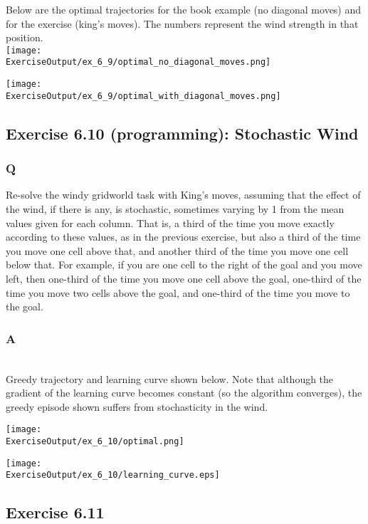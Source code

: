 Below are the optimal trajectories for the book example (no diagonal moves) and for the exercise (king's moves). The numbers represent the wind strength in that position.\\

\texttt{[image: \\ExerciseOutput/ex\_6\_9/optimal\_no\_diagonal\_moves.png]}

\texttt{[image: \\ExerciseOutput/ex\_6\_9/optimal\_with\_diagonal\_moves.png]}



\subsection{Exercise 6.10 (programming): Stochastic Wind}
\subsubsection*{Q}
Re-solve the windy gridworld task with King’s moves, assuming that the effect of the wind, if there is any, is stochastic, sometimes varying by 1 from the mean values given for each column. That is, a third of the time you move exactly according to these values, as in the previous exercise, but also a third of the time you move one cell above that, and another third of the time you move one cell below that. For example, if you are one cell to the right of the goal and you move left, then one-third of the time you move one cell above the goal, one-third of the time you move two cells above the goal, and one-third of the time you move to the goal.

\subsubsection*{A}
\ProgrammingExercise\\

Greedy trajectory and learning curve shown below. Note that although the gradient of the learning curve becomes constant (so the algorithm converges), the greedy episode shown suffers from stochasticity in the wind.

\texttt{[image: \\ExerciseOutput/ex\_6\_10/optimal.png]}

\texttt{[image: \\ExerciseOutput/ex\_6\_10/learning\_curve.eps]}

\subsection{Exercise 6.11}
